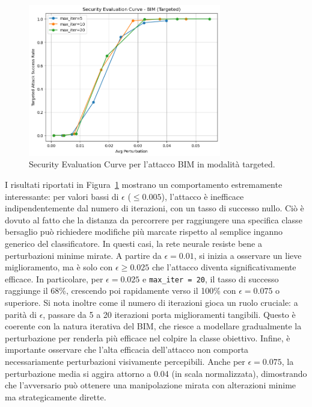             \begin{figure}[H]
                \centering
                \includegraphics[width=0.75\textwidth]{images/evaluation_curve_bim_targeted.png}
                \caption{Security Evaluation Curve per l’attacco BIM in modalità targeted.}
                \label{fig:bim_targeted_curve}
            \end{figure}
            
            \noindent I risultati riportati in Figura~\ref{fig:bim_targeted_curve} mostrano un comportamento estremamente interessante: per valori bassi di \(\epsilon\) (\(\leq 0.005\)), l’attacco è inefficace indipendentemente dal numero di iterazioni, con un tasso di successo nullo. Ciò è dovuto al fatto che la distanza da percorrere per raggiungere una specifica classe bersaglio può richiedere modifiche più marcate rispetto al semplice inganno generico del classificatore. In questi casi, la rete neurale resiste bene a perturbazioni minime mirate.
            A partire da \(\epsilon = 0.01\), si inizia a osservare un lieve miglioramento, ma è solo con \(\epsilon \geq 0.025\) che l’attacco diventa significativamente efficace. In particolare, per \(\epsilon = 0.025\) e \texttt{max\_iter = 20}, il tasso di successo raggiunge il 68\%, crescendo poi rapidamente verso il 100\% con \(\epsilon = 0.075\) o superiore.
            Si nota inoltre come il numero di iterazioni gioca un ruolo cruciale: a parità di \(\epsilon\), passare da 5 a 20 iterazioni porta miglioramenti tangibili. Questo è coerente con la natura iterativa del BIM, che riesce a modellare gradualmente la perturbazione per renderla più efficace nel colpire la classe obiettivo.
            Infine, è importante osservare che l’alta efficacia dell’attacco non comporta necessariamente perturbazioni visivamente percepibili. Anche per \(\epsilon = 0.075\), la perturbazione media si aggira attorno a 0.04 (in scala normalizzata), dimostrando che l’avversario può ottenere una manipolazione mirata con alterazioni minime ma strategicamente dirette.

